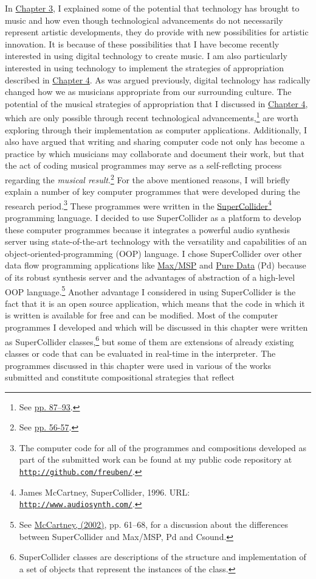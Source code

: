 In \hyperlink{chapter3}{Chapter 3}, I explained some of the potential that technology has brought to music and how even though technological advancements do not necessarily represent artistic developments, they do provide with new possibilities for artistic innovation. It is because of these possibilities that I have become recently interested in using digital technology to create music. I am also particularly interested in using technology to implement the strategies of appropriation described in \hyperlink{chapter4}{Chapter 4}. As was argued previously, digital technology has radically changed how we as musicians appropriate from our surrounding culture. The potential of the musical strategies of appropriation that I discussed in \hyperlink{chapter4}{Chapter 4}, which are only possible through recent technological advancements,\footnote{See \hyperlink{elaborationapprop}{pp. 87--93}.} are worth exploring through their implementation as computer applications. Additionally, I also have argued that writing and sharing computer code not only has become a practice by which musicians may collaborate and document their work, but that the act of coding musical programmes may serve as a self-reflcting process regarding the \emph{musical result}.\footnote{See \hyperlink{codingcons}{pp. 56-57}.} For the above mentioned reasons, I will briefly explain a number of key computer programmes that were developed during the research period.\footnote{The computer code for all of the programmes and compositions developed as part of the submitted work can be found at my public code repository at \href{http://github.com/freuben/}{\texttt{http://github.com/freuben/}}.} These programmes were written in the \href{http://www.audiosynth.com/}{\mbox{SuperCollider}}\footnote{James McCartney, SuperCollider, 1996. URL: \href{http://www.audiosynth.com/}{\texttt{http://www.audiosynth.com/}}.} programming language. I decided to use SuperCollider as a platform to develop these computer programmes because it integrates a powerful audio synthesis server using state-of-the-art technology with the versatility and capabilities of an object-oriented-programming (OOP) language. I chose SuperCollider over other data flow programming applications like \href{http://www.cycling74.com/}{Max/MSP} and \href{http://puredata.info/}{Pure Data} (Pd) because of its robust synthesis server and the advantages of abstraction of a high-level OOP language.\footnote{See \hyperlink{mccartney}{McCartney, (2002)}, pp. 61--68, for a discussion about the differences between SuperCollider and Max/MSP, Pd and Csound.} Another advantage I considered in using SuperCollider is the fact that it is an open source application, which means that the code in which it is written is available for free and can be modified. Most of the computer programmes I developed and which will be discussed in this chapter were written as SuperCollider classes,\footnote{SuperCollider classes are descriptions of the structure and implementation of a set of objects that represent the instances of the class.} but some of them are extensions of already existing classes or code that can be evaluated in real-time in the interpreter. The programmes discussed in this chapter were used in various of the works submitted and constitute compositional strategies that reflect 